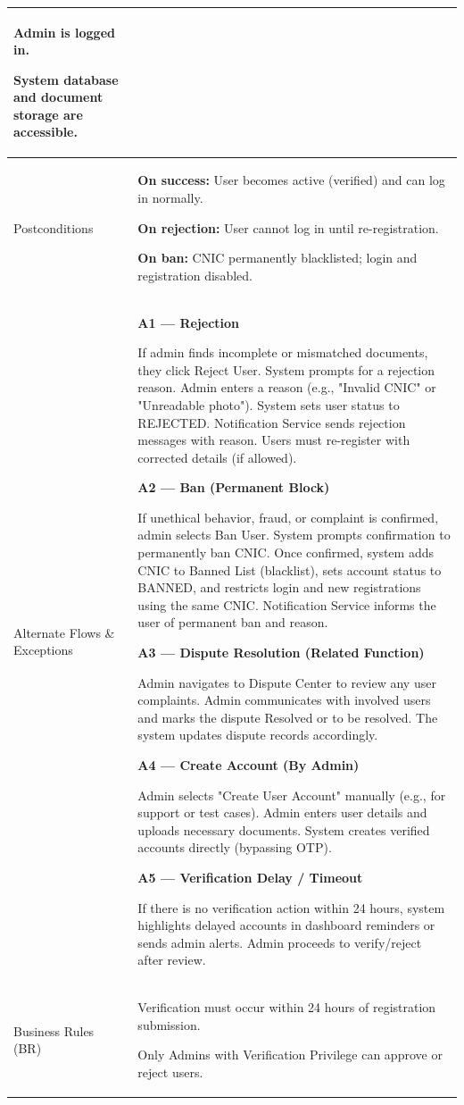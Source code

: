 \begin{longtable}{|p{3.5cm}|p{12cm}|}
Admin is logged in.

System database and document storage are accessible. \\
\hline
Postconditions &
\textbf{On success:} User becomes active (verified) and can log in normally.

\textbf{On rejection:} User cannot log in until re-registration.

\textbf{On ban:} CNIC permanently blacklisted; login and registration disabled. \\
\hline
Alternate Flows \& Exceptions &
\textbf{A1 --- Rejection}

If admin finds incomplete or mismatched documents, they click Reject User. System prompts for a rejection reason. Admin enters a reason (e.g., "Invalid CNIC" or "Unreadable photo"). System sets user status to REJECTED. Notification Service sends rejection messages with reason. Users must re-register with corrected details (if allowed).

\textbf{A2 --- Ban (Permanent Block)}

If unethical behavior, fraud, or complaint is confirmed, admin selects Ban User. System prompts confirmation to permanently ban CNIC. Once confirmed, system adds CNIC to Banned List (blacklist), sets account status to BANNED, and restricts login and new registrations using the same CNIC. Notification Service informs the user of permanent ban and reason.

\textbf{A3 --- Dispute Resolution (Related Function)}

Admin navigates to Dispute Center to review any user complaints. Admin communicates with involved users and marks the dispute Resolved or to be resolved. The system updates dispute records accordingly.

\textbf{A4 --- Create Account (By Admin)}

Admin selects "Create User Account" manually (e.g., for support or test cases). Admin enters user details and uploads necessary documents. System creates verified accounts directly (bypassing OTP).

\textbf{A5 --- Verification Delay / Timeout}

If there is no verification action within 24 hours, system highlights delayed accounts in dashboard reminders or sends admin alerts. Admin proceeds to verify/reject after review. \\
\hline
Business Rules (BR) &
Verification must occur within 24 hours of registration submission.

Only Admins with Verification Privilege can approve or reject users.


\end{longtable}
